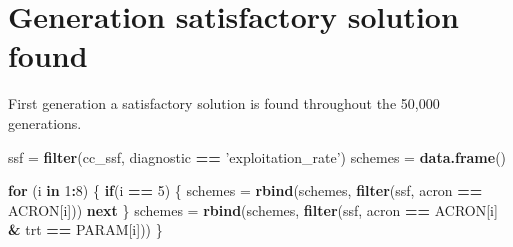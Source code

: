\documentclass[]{book}
\newenvironment{Shaded}{\begin{snugshade}}{\end{snugshade}}
\newcommand{\ControlFlowTok}[1]{\textcolor[rgb]{0.13,0.29,0.53}{\textbf{#1}}}
\newcommand{\DecValTok}[1]{\textcolor[rgb]{0.00,0.00,0.81}{#1}}
\newcommand{\KeywordTok}[1]{\textcolor[rgb]{0.13,0.29,0.53}{\textbf{#1}}}
\newcommand{\NormalTok}[1]{#1}
\newcommand{\OperatorTok}[1]{\textcolor[rgb]{0.81,0.36,0.00}{\textbf{#1}}}
\newcommand{\StringTok}[1]{\textcolor[rgb]{0.31,0.60,0.02}{#1}}
\begin{document}
\hypertarget{generation-satisfactory-solution-found}{%
\section{Generation satisfactory solution found}\label{generation-satisfactory-solution-found}}

First generation a satisfactory solution is found throughout the 50,000 generations.

\begin{Shaded}
\begin{Highlighting}[]
\NormalTok{ssf =}\StringTok{ }\KeywordTok{filter}\NormalTok{(cc_ssf, diagnostic }\OperatorTok{==}\StringTok{ 'exploitation_rate'}\NormalTok{)}
\NormalTok{schemes =}\StringTok{ }\KeywordTok{data.frame}\NormalTok{()}

\ControlFlowTok{for}\NormalTok{ (i }\ControlFlowTok{in} \DecValTok{1}\OperatorTok{:}\DecValTok{8}\NormalTok{) \{}
  \ControlFlowTok{if}\NormalTok{(i }\OperatorTok{==}\StringTok{ }\DecValTok{5}\NormalTok{)}
\NormalTok{  \{}
\NormalTok{    schemes =}\StringTok{ }\KeywordTok{rbind}\NormalTok{(schemes, }\KeywordTok{filter}\NormalTok{(ssf, acron }\OperatorTok{==}\StringTok{ }\NormalTok{ACRON[i]))}
    \ControlFlowTok{next}
\NormalTok{  \}}
\NormalTok{  schemes =}\StringTok{ }\KeywordTok{rbind}\NormalTok{(schemes, }\KeywordTok{filter}\NormalTok{(ssf, acron }\OperatorTok{==}\StringTok{ }\NormalTok{ACRON[i] }\OperatorTok{&}\StringTok{ }\NormalTok{trt }\OperatorTok{==}\StringTok{ }\NormalTok{PARAM[i]))}
\NormalTok{\}}


\end{Highlighting}
\end{Shaded}
\end{document}
